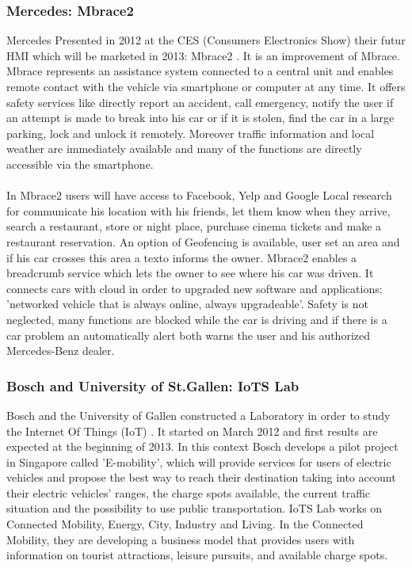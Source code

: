 \documentclass[a4paper]{article}
\begin{document}
\subsubsection{Mercedes: Mbrace2}

Mercedes Presented in 2012 at the CES (Consumers Electronics Show) their futur HMI which will be marketed in 2013: Mbrace2 \cite{Mbrace2}. 
It is an improvement of Mbrace. Mbrace represents an assistance system connected to a central unit and enables remote contact with the vehicle via smartphone or computer at any time. It offers safety services like directly report an accident, call emergency, notify the user if an attempt is made to break into his car or if it is stolen, find the car in a large parking, lock and unlock it remotely. Moreover traffic information and local weather are immediately available and many of the functions are directly accessible via the smartphone.

\paragraph{}In Mbrace2 users will have access to Facebook, Yelp and Google Local research for communicate his location with his friends, let them know when they arrive, search a restaurant, store or night place, purchase cinema tickets and make a restaurant reservation. An option of Geofencing is available, user set an area and if his car crosses this area a texto informs the owner. Mbrace2 enables a breadcrumb service which lets the owner to see where his car was driven. It connects cars with cloud in order to upgraded new software and applications: 'networked vehicle that is always online, always upgradeable'. Safety is not neglected, many functions are blocked while the car is driving and if there is a car problem an automatically alert both warns the user and his authorized Mercedes-Benz dealer.

\subsubsection{Bosch and University of St.Gallen: IoTS Lab}

Bosch and the University of Gallen constructed a Laboratory in order to study the Internet Of Things (IoT) \cite{IoTS}. It started on March 2012 and first results are expected at the beginning of 2013. In this context Bosch develops a pilot project in Singapore called 'E-mobility', which will provide services for users of electric vehicles and propose the best way to reach their destination taking into account their electric vehicles' ranges, the charge spots available, the current traffic situation and the possibility to use public transportation. IoTS Lab works on Connected Mobility, Energy, City, Industry and Living. In the Connected Mobility, they are developing a business model that provides users with information on tourist attractions, leisure pursuits, and available charge spots. 
\end{document}
